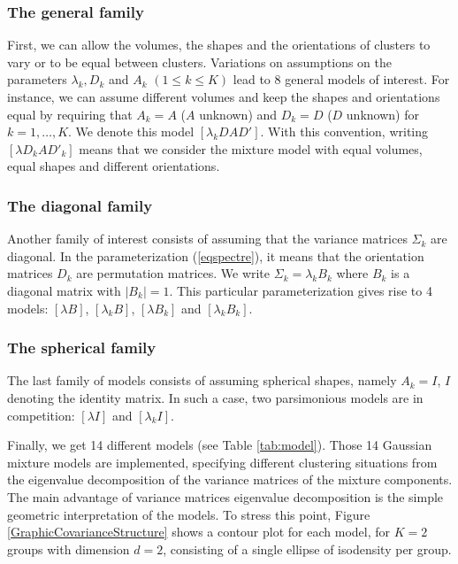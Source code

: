 \documentclass[12pt]{article}
\begin{document}
\subsubsection{The general family}
First, we can allow the volumes, the shapes and the orientations of clusters to vary or to be
equal between clusters. Variations on assumptions on the parameters $\lambda_{k}, D_{k}$ and
$A_{k}$ $(1 \leq k \leq K)$ lead to 8 general models of interest. For instance, we can assume
different volumes and keep the shapes and orientations equal by requiring that $A_{k}=A$ ($A$
unknown) and $D_{k}=D$ ($D$ unknown) for $k=1,\ldots,K$. We denote this model
$[\lambda_{k}DAD']$. With this convention, writing $[\lambda D_{k}AD'_{k}]$ means that we
consider the mixture model with equal volumes, equal shapes and different orientations.

\subsubsection{The diagonal family}
Another family of interest consists of assuming that the variance matrices $\Sigma_{k}$ are
diagonal. In the parameterization (\ref{eqspectre}), it means that the orientation matrices
$D_{k}$ are permutation matrices. We write $\Sigma_{k}=\lambda_{k}B_{k}$ where $B_{k}$ is a
diagonal matrix with $| B_{k}|=1$.  This particular parameterization gives rise to 4 models:
$[\lambda B]$, $[\lambda_{k}B]$, $[\lambda B_{k}]$ and $[\lambda_{k}B_{k}]$.

\subsubsection{The spherical family}
The last family of models consists of assuming spherical shapes, namely $A_{k}=I$, $I$ denoting
the identity matrix. In such a case, two parsimonious models are in competition: $[\lambda I]$
and $[\lambda_{k}I]$.

Finally, we get 14 different models (see Table \ref{tab:model}).  Those 14 Gaussian mixture
models are implemented, specifying different clustering situations from the eigenvalue
decomposition of the variance matrices of the mixture components. The main advantage of
variance matrices eigenvalue decomposition is the simple geometric interpretation of the
models.  To stress this point, Figure \ref{GraphicCovarianceStructure} shows a contour plot for
each model, for $K=2$ groups with dimension $d=2$, consisting of a single ellipse of isodensity
per group.
\end{document}
